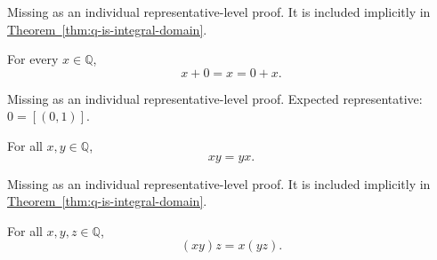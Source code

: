 \begin{remark*}[Status]
Missing as an individual representative-level proof. It is included implicitly in \hyperref[thm:q-is-integral-domain]{Theorem~\ref*{thm:q-is-integral-domain}}.
\end{remark*}

\begin{tcolorbox}[colback=thmbox, colframe=thmborder, arc=2pt,
  left=6pt, right=6pt, top=4pt, bottom=4pt,
  title={\small\textbf{Theorem (Rational Additive Identity)}},
  fonttitle=\small\bfseries]
\begin{theorem}
\label{thm:rational-additive-identity}
For every $x\in\mathbb{Q}$,
\[
x+0=x=0+x.
\]
\end{theorem}
\end{tcolorbox}

\begin{remark*}[Status]
Missing as an individual representative-level proof. Expected representative: $0=[(0,1)]$.
\end{remark*}

\begin{tcolorbox}[colback=thmbox, colframe=thmborder, arc=2pt,
  left=6pt, right=6pt, top=4pt, bottom=4pt,
  title={\small\textbf{Theorem (Rational Multiplication Is Commutative)}},
  fonttitle=\small\bfseries]
\begin{theorem}
\label{thm:rational-multiplication-commutative}
For all $x,y\in\mathbb{Q}$,
\[
xy=yx.
\]
\end{theorem}
\end{tcolorbox}

\begin{remark*}[Status]
Missing as an individual representative-level proof. It is included implicitly in \hyperref[thm:q-is-integral-domain]{Theorem~\ref*{thm:q-is-integral-domain}}.
\end{remark*}

\begin{tcolorbox}[colback=thmbox, colframe=thmborder, arc=2pt,
  left=6pt, right=6pt, top=4pt, bottom=4pt,
  title={\small\textbf{Theorem (Rational Multiplication Is Associative)}},
  fonttitle=\small\bfseries]
\begin{theorem}
\label{thm:rational-multiplication-associative}
For all $x,y,z\in\mathbb{Q}$,
\[
(xy)z=x(yz).
\]
\end{theorem}
\end{tcolorbox}

